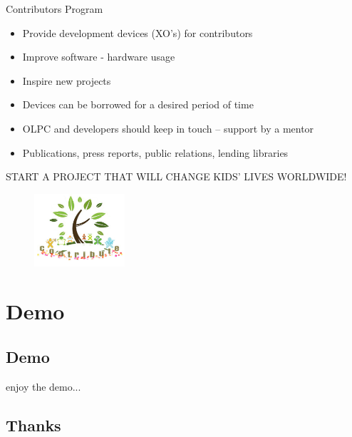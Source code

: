 \documentclass[compress]{beamer}
\begin{document}
\begin{frame}{Contributors Program}
\begin{itemize}
\item Provide development devices (XO's) for contributors
\item Improve software - hardware usage
\item Inspire new projects
\end{itemize}
\pause
\begin{itemize}
\item Devices can be borrowed for a desired period of time
\item OLPC and developers should keep in touch -- support by a mentor
\item Publications, press reports, public relations, lending libraries
\end{itemize}
\pause
\begin{center}
{\color{blue} \footnotesize START A PROJECT THAT WILL CHANGE KIDS' LIVES WORLDWIDE!}
\end{center}
\begin{figure}
    \centering
    \includegraphics[width=0.3\textwidth]{images/Contributetree1.jpg}
\end{figure}
\end{frame}

\section{Demo}

\subsection{Demo}
\begin{frame}
\huge
enjoy the demo...
\end{frame}

\subsection{Thanks}
\end{document}
